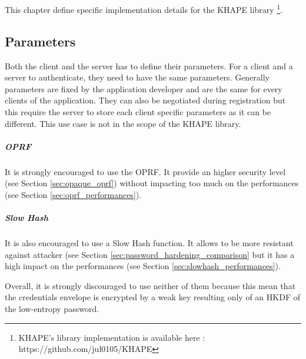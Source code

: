 \documentclass[../report.tex]{subfiles}
\begin{document}
\chapter{} \label{cha:implementation}


This chapter define specific implementation details for the KHAPE library \footnote{KHAPE's library implementation is available here : https://github.com/jul0105/KHAPE}.

\section{Parameters}
Both the client and the server has to define their parameters. For a client and a server to authenticate, they need to have the same parameters. 
Generally parameters are fixed by the application developer and are the same for every clients of the application.
They can also be negotiated during registration but this require the server to store each client specific parameters as it can be different. This use case is not in the scope of the KHAPE library.

\paragraph{OPRF}
It is strongly encouraged to use the OPRF.
It provide an higher security level (see Section \ref{sec:opaque_oprf}) without impacting too much on the performances (see Section \ref{sec:oprf_performances}).


\paragraph{Slow Hash}
It is also encouraged to use a Slow Hash function. It allows to be more resistant against attacker (see Section \ref{sec:password_hardening_comparison} but it has a high impact on the performances (see Section \ref{sec:slowhash_performances}).

Overall, it is strongly discouraged to use neither of them because this mean that the credentials envelope is encrypted by a weak key resulting only of an HKDF of the low-entropy password.
\end{document}

